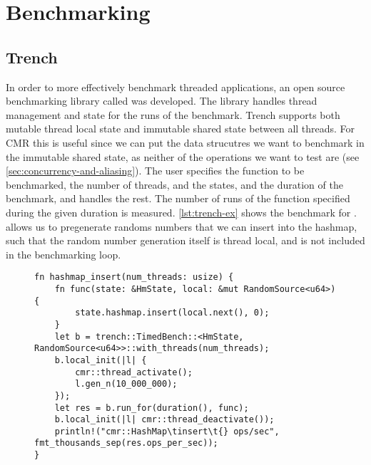 \section{Benchmarking}
\lorem{}

\subsection{Trench}

In order to more effectively benchmark threaded applications, an open source benchmarking library
called \cite{trench} was developed. The library handles thread management and state
for the runs of the benchmark. Trench supports both mutable thread local state and immutable shared
state between all threads. For CMR this is useful since we can put the data strucutres we want to
benchmark in the immutable shared state, as neither of the operations we want to test are
 (see \cref{sec:concurrency-and-aliasing}). The user specifies the function to be
benchmarked, the number of threads, and the states, and the duration of the benchmark, and
 handles the rest. The number of runs of the function specified during the given
duration is measured.  \cref{lst:trench-ex} shows the benchmark for .
 allows us to pregenerate randoms numbers that we can insert into the hashmap,
such that the random number generation itself is thread local, and is not included in the
benchmarking loop.

\begin{figure}[ht]
\begin{lstlisting}[label=lst:trench-ex,caption=\code{Hashmap::insert} benchmark using \code{trench}]
fn hashmap_insert(num_threads: usize) {
    fn func(state: &HmState, local: &mut RandomSource<u64>) {
        state.hashmap.insert(local.next(), 0);
    }
    let b = trench::TimedBench::<HmState, RandomSource<u64>>::with_threads(num_threads);
    b.local_init(|l| {
        cmr::thread_activate();
        l.gen_n(10_000_000);
    });
    let res = b.run_for(duration(), func);
    b.local_init(|l| cmr::thread_deactivate());
    println!("cmr::HashMap\tinsert\t{} ops/sec", fmt_thousands_sep(res.ops_per_sec));
}
\end{lstlisting}
\end{figure}
